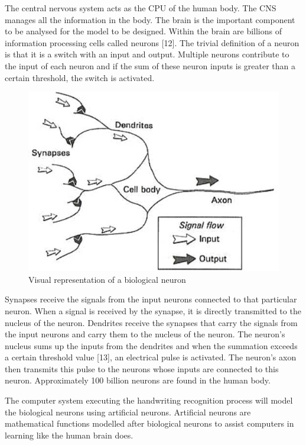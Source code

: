 The central nervous system acts as the CPU of the human body. The CNS manages all the information in the body. The brain is the important component to be analysed for the model to be designed. Within the brain are billions of information processing cells called neurons [12]. The trivial definition of a neuron is that it is a switch with an input and output. Multiple neurons contribute to the input of each neuron and if the sum of these neuron inputs is greater than a certain threshold, the switch is activated. \\
\begin{figure}[h]
	\centering
	\includegraphics[scale=0.6]{4}
	\caption{Visual representation of a biological neuron}
\end{figure}

	Synapses receive the signals from the input neurons connected to that particular neuron. When a signal is received by the synapse, it is directly transmitted to the nucleus of the neuron. Dendrites receive the synapses that carry the signals from the input neurons and carry them to the nucleus of the neuron. The neuron’s nucleus sums up the inputs from the dendrites and when the summation exceeds a certain threshold value [13], an electrical pulse is activated. The neuron’s axon then transmits this pulse to the neurons whose inputs are connected to this neuron. Approximately 100 billion neurons are found in the human body.

The computer system executing the handwriting recognition process will model the biological neurons using artificial neurons. Artificial neurons are mathematical functions modelled after biological neurons to assist computers in learning like the human brain does. 

